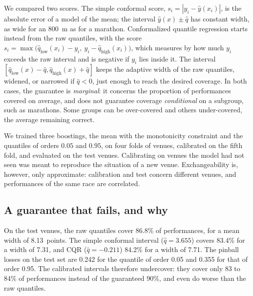 \documentclass[11pt,a4paper]{article}
\begin{document}
We compared two scores. The simple conformal score, $s_i = |y_i - \hat y(x_i)|$, is the absolute error of a model of the
mean; the interval $\hat y(x) \pm \hat q$ has constant width, as wide for an 800~m as for a marathon. Conformalized
quantile regression \citep[CQR,][]{romano2019} starts instead from the raw quantiles, with the score
$s_i = \max\big(\hat q_{\text{low}}(x_i) - y_i,\ y_i - \hat q_{\text{high}}(x_i)\big)$, which measures by how much $y_i$
exceeds the raw interval and is negative if $y_i$ lies inside it. The interval
$[\hat q_{\text{low}}(x) - \hat q, \hat q_{\text{high}}(x) + \hat q]$ keeps the adaptive width of the raw quantiles,
widened, or narrowed if $\hat q < 0$, just enough to reach the desired coverage. In both cases, the guarantee is
\emph{marginal}: it concerns the proportion of performances covered on average, and does not guarantee coverage
\emph{conditional} on a subgroup, such as marathons. Some groups can be over-covered and others under-covered, the
average remaining correct.

We trained three boostings, the mean with the monotonicity constraint and the quantiles of orders $0.05$ and $0.95$,
on four folds of venues, calibrated on the fifth fold, and evaluated on the test venues. Calibrating on venues the
model had not seen was meant to reproduce the situation of a new venue. Exchangeability is, however, only approximate:
calibration and test concern different venues, and performances of the same race are correlated.

\subsection{A guarantee that fails, and why}\label{sec:undercoverage}

On the test venues, the raw quantiles cover 86.8\% of performances, for a mean width of 8.13~points. The simple
conformal interval ($\hat q = 3.655$) covers 83.4\% for a width of 7.31, and CQR ($\hat q = -0.211$) 84.2\% for a width
of 7.71. The pinball losses on the test set are 0.242 for the quantile of order 0.05 and 0.355 for that of order 0.95.
The calibrated intervals therefore undercover: they cover only 83 to 84\% of performances instead of the guaranteed
90\%, and even do worse than the raw quantiles.
\end{document}
